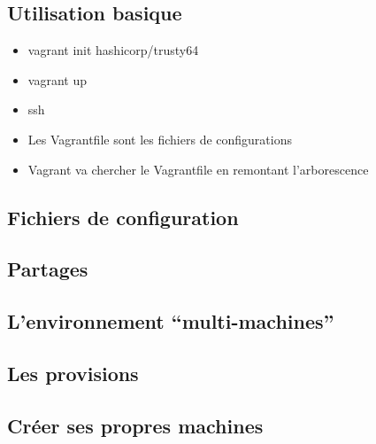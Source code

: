 \documentclass{beamer}
\begin{document}
    \subsection{Utilisation basique}
    \begin{frame}
        \begin{itemize}
            \item{vagrant init hashicorp/trusty64}
            \item{vagrant up}
            \item{ssh}
        \end{itemize}

        \begin{itemize}
            \item{Les Vagrantfile sont les fichiers de configurations}
            \item{Vagrant va chercher le Vagrantfile en remontant l'arborescence}
        \end{itemize}
    \end{frame}

    \subsection{Fichiers de configuration}
    \begin{frame}
    \end{frame}
    
    \subsection{Partages}
    \begin{frame}
    \end{frame}

    \subsection{L'environnement ``multi-machines''}
    \begin{frame}
    \end{frame}

    \subsection{Les provisions}
    \begin{frame}
    \end{frame}

    \subsection{Créer ses propres machines}
    \begin{frame}
    \end{frame}
\end{document}
